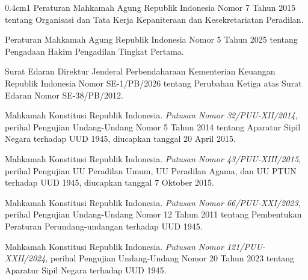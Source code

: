 \documentclass[12pt,a4paper,twocolumn]{article}
\begin{document}
\begin{hangparas}{0.4cm}{1}
    Peraturan Mahkamah Agung Republik Indonesia Nomor 7 Tahun 2015 tentang Organisasi dan Tata Kerja Kepaniteraan dan Kesekretariatan Peradilan.

    Peraturan Mahkamah Agung Republik Indonesia Nomor 5 Tahun 2025 tentang Pengadaan Hakim Pengadilan Tingkat Pertama.

    Surat Edaran Direktur Jenderal Perbendaharaan Kementerian Keuangan Republik Indonesia Nomor SE-1/PB/2026 tentang Perubahan Ketiga atas Surat Edaran Nomor SE-38/PB/2012.

    Mahkamah Konstitusi Republik Indonesia. \textit{Putusan Nomor 32/PUU-XII/2014}, perihal Pengujian Undang-Undang Nomor 5 Tahun 2014 tentang Aparatur Sipil Negara terhadap UUD 1945, diucapkan tanggal 20 April 2015.

    Mahkamah Konstitusi Republik Indonesia. \textit{Putusan Nomor 43/PUU-XIII/2015}, perihal Pengujian UU Peradilan Umum, UU Peradilan Agama, dan UU PTUN terhadap UUD 1945, diucapkan tanggal 7 Oktober 2015.

    Mahkamah Konstitusi Republik Indonesia. \textit{Putusan Nomor 66/PUU-XXI/2023}, perihal Pengujian Undang-Undang Nomor 12 Tahun 2011 tentang Pembentukan Peraturan Perundang-undangan terhadap UUD 1945.

    Mahkamah Konstitusi Republik Indonesia. \textit{Putusan Nomor 121/PUU-XXII/2024}, perihal Pengujian Undang-Undang Nomor 20 Tahun 2023 tentang Aparatur Sipil Negara terhadap UUD 1945.
\end{hangparas}
\end{document}
